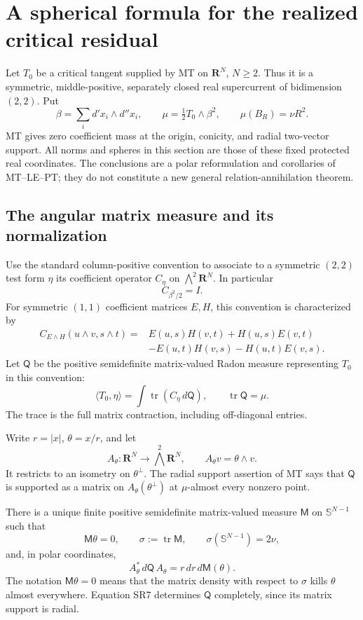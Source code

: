 \section{A spherical formula for the realized critical residual}
\label{sec:r13-spherical-critical-residual}

Let $T_0$ be a critical tangent supplied by MT on
$\mathbf R^N$, $N\ge2$.  Thus it is a symmetric,
middle-positive, separately closed real supercurrent of
bidimension $(2,2)$.  Put
\[
 \beta=\sum_i d'x_i\wedge d''x_i,\qquad
 \mu=\tfrac12T_0\wedge\beta^2,\qquad
 \mu(B_R)=\nu R^2.
 \tag{SR1}
\]
MT gives zero coefficient mass at the origin, conicity,
and radial two-vector support.  All norms and spheres in
this section are those of these fixed protected real
coordinates.  The conclusions are a polar reformulation
and corollaries of MT--LE--PT; they do not constitute a
new general relation-annihilation theorem.

\subsection{The angular matrix measure and its normalization}

Use the standard column-positive convention to associate
to a symmetric $(2,2)$ test form $\eta$ its coefficient
operator $C_\eta$ on $\bigwedge^2\mathbf R^N$.  In
particular
\[
                    C_{\beta^2/2}=I.
 \tag{SR2}
\]
For symmetric $(1,1)$ coefficient matrices $E,H$, this
convention is characterized by
\[
\begin{split}
C_{E\wedge H}(u\wedge v,s\wedge t)
={}&E(u,s)H(v,t)+H(u,s)E(v,t)\\
 &-E(u,t)H(v,s)-H(u,t)E(v,s).
\end{split}
 \tag{SR3}
\]
Let $\mathsf Q$ be the positive semidefinite matrix-valued
Radon measure representing $T_0$ in this convention:
\[
 \langle T_0,\eta\rangle
       =\int\operatorname{tr}(C_\eta\,d\mathsf Q),
                 \qquad \operatorname{tr}\mathsf Q=\mu.
 \tag{SR4}
\]
The trace is the full matrix contraction, including off-diagonal
entries.

Write $r=|x|$, $\theta=x/r$, and let
\[
 A_\theta:\mathbf R^N\longrightarrow\bigwedge^2\mathbf R^N,
                     \qquad A_\theta v=\theta\wedge v.
 \tag{SR5}
\]
It restricts to an isometry on $\theta^\perp$.  The radial
support assertion of MT says that $\mathsf Q$ is supported
as a matrix on $A_\theta(\theta^\perp)$ at $\mu$-almost
every nonzero point.

\begin{proposition}
\label{prop:r13-angular-critical-matrix}
There is a unique finite positive semidefinite matrix-valued
measure $\mathsf M$ on $\mathbb S^{N-1}$ such that
\[
 \mathsf M\theta=0,\qquad
 \sigma:=\operatorname{tr}\mathsf M,\qquad
                   \sigma(\mathbb S^{N-1})=2\nu,
 \tag{SR6}
\]
and, in polar coordinates,
\[
 A_\theta^*\,d\mathsf Q\,A_\theta
                         =r\,dr\,d\mathsf M(\theta).
 \tag{SR7}
\]
The notation $\mathsf M\theta=0$ means that the matrix
density with respect to $\sigma$ kills $\theta$ almost
everywhere.  Equation SR7 determines $\mathsf Q$ completely,
since its matrix support is radial.
\end{proposition}

